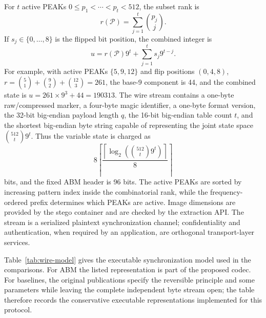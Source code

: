 \documentclass[a4paper,fleqn]{cas-dc}
\begin{document}
For $t$ active PEAKs $0\le p_1<\cdots<p_t<512$, the subset rank is
\begin{equation}
r(\mathcal P)=\sum_{j=1}^{t}\binom{p_j}{j}.
\label{eq:combination-rank}
\end{equation}
If $s_j\in\{0,\ldots,8\}$ is the flipped bit position, the combined integer is
\begin{equation}
u=r(\mathcal P)9^t+\sum_{j=1}^{t}s_j9^{t-j}.
\label{eq:enumerative-state}
\end{equation}
For example, with active PEAKs $\{5,9,12\}$ and flip positions $(0,4,8)$,
$r=\binom51+\binom92+\binom{12}3=261$, the base-9 component is 44, and the
combined state is $u=261\times9^3+44=190313$.
The wire stream contains a one-byte raw/compressed marker, a four-byte magic
identifier, a one-byte format version, the 32-bit big-endian payload length
$q$, the 16-bit big-endian table count $t$, and the shortest big-endian byte
string capable of representing the joint state space
$\binom{512}{t}9^t$. Thus the variable state is charged as
\begin{equation}
8\left\lceil
\frac{\left\lceil\log_2\left(\binom{512}{t}9^t\right)\right\rceil}{8}
\right\rceil
\label{eq:wire-state-bytes}
\end{equation}
bits, and the fixed ABM header is 96 bits. The active PEAKs are sorted by
increasing pattern index inside the combinatorial rank, while the
frequency-ordered prefix determines which PEAKs are active. Image dimensions
are provided by the stego container and are checked by the extraction API. The
stream is a serialized plaintext synchronization channel; confidentiality and
authentication, when required by an application, are orthogonal transport-layer
services.

Table~\ref{tab:wire-model} gives the executable synchronization model used in
the comparisons. For ABM the listed representation is part of the proposed
codec. For baselines, the original publications specify the reversible
principle and some parameters while leaving the complete independent byte
stream open; the table therefore records the conservative executable
representations implemented for this protocol.
\end{document}
